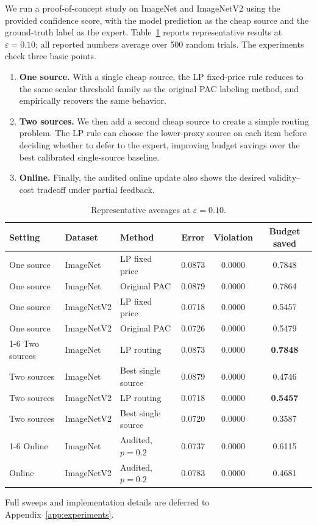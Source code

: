 \documentclass[11pt]{article}
\newcommand{\eps}{\varepsilon}
\begin{document}
We run a proof-of-concept study on ImageNet and ImageNetV2 using the provided
confidence score, with the model prediction as the cheap source and the
ground-truth label as the expert. Table~\ref{tab:experiment-main-results}
reports representative results at \(\eps=0.10\); all reported numbers average
over 500 random trials. The experiments check three basic points.

\begin{enumerate}[leftmargin=*]
    \item \textbf{One source.} With a single cheap source, the LP fixed-price
    rule reduces to the same scalar threshold family as the original PAC
    labeling method, and empirically recovers the same behavior.

    \item \textbf{Two sources.} We then add a second cheap source to create a
    simple routing problem. The LP rule can choose the lower-proxy source on
    each item before deciding whether to defer to the expert, improving budget
    savings over the best calibrated single-source baseline.

    \item \textbf{Online.} Finally, the audited online update also shows the
    desired validity--cost tradeoff under partial feedback.
\end{enumerate}

\begin{table}[htbp]
\centering
\small
\begin{tabular}{lllccc}
\toprule
Setting & Dataset & Method & Error & Violation & Budget saved \\
\midrule
One source & ImageNet & LP fixed price & 0.0873 & 0.0000 & 0.7848 \\
One source & ImageNet & Original PAC & 0.0879 & 0.0000 & 0.7864 \\
One source & ImageNetV2 & LP fixed price & 0.0718 & 0.0000 & 0.5457 \\
One source & ImageNetV2 & Original PAC & 0.0726 & 0.0000 & 0.5479 \\
\cmidrule(lr){1-6}
Two sources & ImageNet & LP routing & 0.0873 & 0.0000 & \textbf{0.7848} \\
Two sources & ImageNet & Best single source & 0.0879 & 0.0000 & 0.4746 \\
Two sources & ImageNetV2 & LP routing & 0.0718 & 0.0000 & \textbf{0.5457} \\
Two sources & ImageNetV2 & Best single source & 0.0720 & 0.0000 & 0.3587 \\
\cmidrule(lr){1-6}
Online & ImageNet & Audited, \(p=0.2\) & 0.0737 & 0.0000 & 0.6115 \\
Online & ImageNetV2 & Audited, \(p=0.2\) & 0.0783 & 0.0000 & 0.4681 \\
\bottomrule
\end{tabular}
\caption{Representative averages at \(\eps=0.10\).}
\label{tab:experiment-main-results}
\end{table}
Full sweeps and
implementation details are deferred to Appendix~\ref{app:experiments}.
\end{document}
